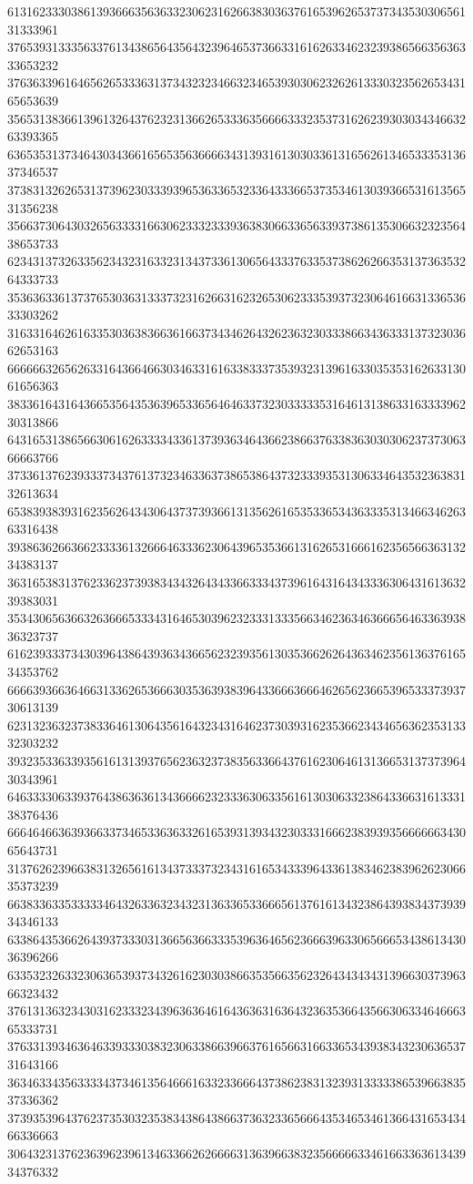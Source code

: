 61316233303861393666356363323062316266383036376165396265373734353030656131333961
37653931333563376134386564356432396465373663316162633462323938656635636333653232
37636339616465626533363137343232346632346539303062326261333032356265343165653639
35653138366139613264376232313662653336356666333235373162623930303434663263393365
63653531373464303436616565356366663431393161303033613165626134653335313637346537
37383132626531373962303339396536336532336433366537353461303936653161356531356238
35663730643032656333316630623332333936383066336563393738613530663232356438653733
62343137326335623432316332313437336130656433376335373862626635313736353264333733
35363633613737653036313337323162663162326530623335393732306461663133653633303262
31633164626163353036383663616637343462643262363230333866343633313732303662653163
66666632656263316436646630346331616338333735393231396163303535316263313061656363
38336164316436653564353639653365646463373230333335316461313863316333396230313866
64316531386566306162633334336137393634643662386637633836303030623737306366663766
37336137623933373437613732346336373865386437323339353130633464353236383132613634
65383938393162356264343064373739366131356261653533653436333531346634626363316438
39386362663662333361326664633362306439653536613162653166616235656636313234383137
36316538313762336237393834343264343366333437396164316434333630643161363239383031
35343065636632636665333431646530396232333133356634623634636665646336393836323737
61623933373430396438643936343665623239356130353662626436346235613637616534353762
66663936636466313362653666303536393839643366636664626562366539653337393730613139
62313236323738336461306435616432343164623730393162353662343465636235313332303232
39323533633935616131393765623632373835633664376162306461313665313737396430343961
64633330633937643863636134366662323336306335616130306332386433663161333138376436
66646466363936633734653363633261653931393432303331666238393935666666343065643731
31376262396638313265616134373337323431616534333964336138346238396262306635373239
66383363353333346432633632343231363365336665613761613432386439383437393934346133
63386435366264393733303136656366333539636465623666396330656665343861343036396266
63353232633230636539373432616230303866353566356232643434343139663037396366323432
37613136323430316233323439636364616436363163643236353664356630633464666365333731
37633139346364633933303832306338663966376165663166336534393834323063653731643166
36346334356333343734613564666163323366643738623831323931333338653966383537336362
37393539643762373530323538343864386637363233656664353465346136643165343466336663
30643231376236396239613463366262666631363966383235666663346166336361343934376332
